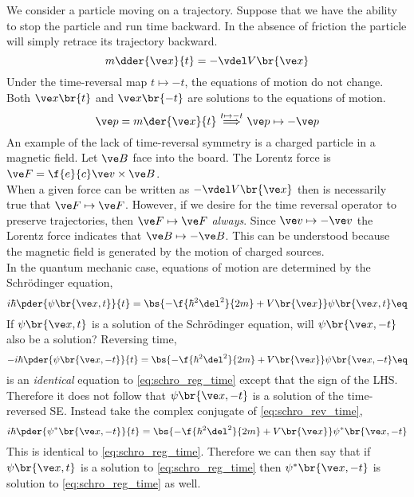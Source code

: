 \documentclass{article}
\begin{document}
We consider a particle moving on a trajectory. Suppose that we have the ability to stop the particle and run time backward. In the absence of friction the particle will simply retrace its trajectory backward.
\[ m \dder{\ve x}{t} = - \vdel V \br{\ve x} \]
Under the time-reversal map $t \mapsto -t$, the equations of motion do not change. Both $\ve x\br{t}$ and $\ve x\br{-t}$ are solutions to the equations of motion.
\[ \ve p = m \der{\ve x}{t} \stackrel{t \mapsto -t}{\implies} \ve p \mapsto - \ve p \]
An example of the lack of time-reversal symmetry is a charged particle in a magnetic field. Let $\ve B$ face into the board. The Lorentz force is $\ve F = \f{e}{c} \ve v \times \ve B$.\\
When a given force can be written as $- \vdel V \br{\ve x}$ then is necessarily true that $\ve F \mapsto \ve F$. However, if we desire for the time reversal operator to preserve trajectories, then $\ve F \mapsto \ve F$ \textit{always}. Since $\ve v \mapsto -\ve v$ the Lorentz force indicates that $\ve B \mapsto -\ve B$. This can be understood because the magnetic field is generated by the motion of charged sources.\\

In the quantum mechanic case, equations of motion are determined by the Schrödinger equation,
\[ i \hbar \pder{\psi\br{\ve x, t}}{t} = \bs{-\f{\hbar^2 \del^2}{2m} + V \br{\ve x}} \psi \br{\ve x, t} \eq \label{eq:schro_reg_time}\]
If $\psi \br{\ve x, t}$ is a solution of the Schrödinger equation, will $\psi \br{\ve x, -t}$ also be a solution? Reversing time,
\[ -i \hbar \pder{\psi\br{\ve x, -t}}{t} = \bs{-\f{\hbar^2 \del^2}{2m} + V \br{\ve x}} \psi \br{\ve x, -t} \eq \label{eq:schro_rev_time}\]
 is an \textit{identical} equation to \cref{eq:schro_reg_time} except that the sign of the LHS. Therefore it does not follow that $\psi\br{\ve x, - t}$ is a solution of the time-reversed SE. Instead take the complex conjugate of \cref{eq:schro_rev_time},
\[ i \hbar \pder{\psi^*\br{\ve x, -t}}{t} = \bs{-\f{\hbar^2 \del^2}{2m} + V \br{\ve x}} \psi^* \br{\ve x, -t} \]
This is identical to \cref{eq:schro_reg_time}. Therefore we can then say that if $\psi\br{\ve x, t}$ is a solution to \cref{eq:schro_reg_time} then $\psi^*\br{\ve x, -t}$ is solution to \cref{eq:schro_reg_time} as well. \\
\end{document}
